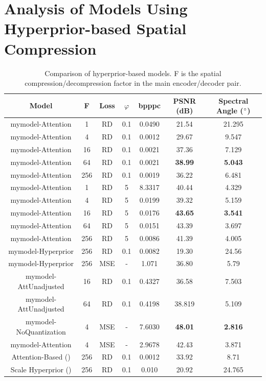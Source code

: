 \section[Analysis of Hyperprior-based Models]{Analysis of Models Using Hyperprior-based Spatial Compression\label{sec:ch5hyperprior}}
\begin{table}
\centering
\caption[Comparison of Hyperprior-based Models]{Comparison of hyperprior-based models. F is the spatial compression/decompression factor in the main encoder/decoder pair.}
\begin{tabular}{|c|c|c|c|c|c|c|}
\hline
Model & F & Loss &$\varphi$ & bpppc & PSNR (dB) & Spectral Angle ($\degree$) \\
\hline\hline
\ac{mymodel}-Attention & 1 & RD & 0.1 & 0.0490 & 21.54 & 21.295 \\
\hline
\ac{mymodel}-Attention & 4 & RD & 0.1 & 0.0012 & 29.67 & 9.547 \\
\hline
\ac{mymodel}-Attention & 16 & RD & 0.1 & 0.0021 & 37.36 & 7.129 \\
\hline
\ac{mymodel}-Attention & 64 & RD & 0.1 & 0.0021 & \textbf{38.99} & \textbf{5.043} \\
\hline
\ac{mymodel}-Attention & 256 & RD & 0.1 & 0.0019 & 36.22 & 6.481 \\
\hline
\ac{mymodel}-Attention & 1 & RD & 5 & 8.3317 & 40.44 & 4.329 \\
\hline
\ac{mymodel}-Attention & 4 & RD & 5 & 0.0199 & 39.32 & 5.159 \\
\hline
\ac{mymodel}-Attention & 16 & RD & 5 & 0.0176 & \textbf{43.65} & \textbf{3.541} \\
\hline
\ac{mymodel}-Attention & 64 & RD & 5 & 0.0151 & 43.39 & 3.697 \\
\hline
\ac{mymodel}-Attention & 256 & RD & 5 & 0.0086 & 41.39 & 4.005 \\
\hline
\ac{mymodel}-Hyperprior & 256 & RD & 0.1 & 0.0082 & 19.30 & 24.56 \\
\hline
\ac{mymodel}-Hyperprior & 256 & MSE & - & 1.071 & 36.80 & 5.79 \\
\hline
\ac{mymodel}-AttUnadjusted & 16 & RD & 0.1 & 0.4327 & 36.58 & 7.503 \\
\hline
\ac{mymodel}-AttUnadjusted & 64 & RD & 0.1 & 0.4198 & 38.819 & 5.109 \\
\hline
\ac{mymodel}-NoQuantization & 4 & MSE & - & 7.6030 & \textbf{48.01} & \textbf{2.816} \\
\hline
\ac{mymodel}-Attention & 4 & MSE & - & 2.9678 & 42.43 & 3.871 \\
\hline
Attention-Based (\citep{cheng_learned_2020}) & 256 & RD & 0.1 & 0.0012 & 33.92 & 8.71 \\
\hline
Scale Hyperprior (\citep{balle_variational_2018}) & 256 & RD & 0.1 & 0.010 & 20.92 & 24.765 \\
\hline
\end{tabular}
\label{fig:hyperpriorcomp}
\end{table}

